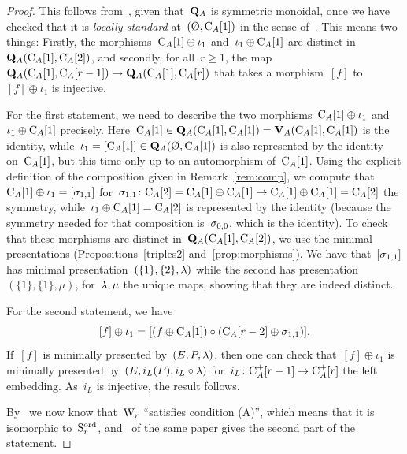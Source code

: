 \begin{proof}
This follows from~\cite[Prop.~2.9, Thm.~2.10]{Randal-Williams+Wahl}, given that~$\mathbf{Q}_A$ is symmetric monoidal, once we have checked that it is {\em locally standard} at~$(\emptyset,\rmC_A[1])$ in the sense of~\cite[Def.~2.5]{Randal-Williams+Wahl}. This means two things: Firstly, the morphisms~$\mathrm{C}_A[1]\oplus\iota_{1}$ and~$\iota_{1}\oplus\mathrm{C}_A[1]$ are distinct in~$\mathbf{Q}_A(\mathrm{C}_A[1],\mathrm{C}_A[2])$, and secondly, for all~$r\geqslant1$, the map~$\mathbf{Q}_A(\mathrm{C}_A[1],\mathrm{C}_A[r-1])\to \mathbf{Q}_A(\mathrm{C}_A[1],\mathrm{C}_A[r])$ that takes a morphism~$[f]$ to~$[f]\oplus\iota_{1}$ is injective.

For the first statement, 
we need to describe the two morphisms~$\mathrm{C}_A[1]\oplus\iota_{1}$ and~$\iota_{1}\oplus\mathrm{C}_A[1]$ precisely. Here~\hbox{$\mathrm{C}_A[1]\in \mathbf{Q}_A(\mathrm{C}_A[1],\mathrm{C}_A[1])=\mathbf{V}_A(\mathrm{C}_A[1],\mathrm{C}_A[1])$} is the identity, while~$\iota_1=[\rmC_A[1]]\in\bfQ_A(\emptyset,\rmC_A[1])$ is also represented by the identity on~$\mathrm{C}_A[1]$, but this time only up to an automorphism of~$\mathrm{C}_A[1]$. 
Using the explicit definition of the composition given in Remark~\ref{rem:comp}, we compute that~$\mathrm{C}_A[1]\oplus\iota_{1}=[\sigma_{1,1}]$ for~\hbox{$\sigma_{1,1}\colon\mathrm{C}_A[2]=\mathrm{C}_A[1]\oplus \mathrm{C}_A[1]\to \mathrm{C}_A[1]\oplus\mathrm{C}_A[1]=\mathrm{C}_A[2]$} the symmetry, while~$\iota_{1}\oplus\mathrm{C}_A[1]=\mathrm{C}_A[2]$ 
is represented by the identity (because the symmetry needed for that composition is~$\sigma_{0,0}$, which is the identity). 
To check that these morphisms are distinct in~$\mathbf{Q}_A(\mathrm{C}_A[1],\mathrm{C}_A[2])$, we use the minimal presentations (Propositions~\ref{triples2} and~\ref{prop:morphisms}). 
We have that~$[\sigma_{1,1}]$ has minimal presentation~$(\{1\},\{2\},\lambda)$ 
while the second has presentation~$(\{1\},\{1\},\mu)$, for~$\lambda,\mu$ the unique maps, showing that they are indeed distinct. 


For the second statement, we have
\[
[f]\oplus\iota_{1}=[(f\oplus\mathrm{C}_A[1])\circ (\mathrm{C}_A[r-2]\oplus\sigma_{1,1})].
\]
If~$[f]$ is minimally presented by~$(E,P,\lambda)$, then one can check that~$[f]\oplus\iota_{1}$ is minimally 
presented by~$(E,i_L(P),i_L\circ \lambda)$ for~$i_L\colon\mathrm{C}^+_A[r-1]\to \mathrm{C}^+_A[r]$ the left embedding. As~$i_L$ is injective, the result follows. 


By~\cite[Prop.~2.9]{Randal-Williams+Wahl} we now know that~$\mathrm{W}_r$ ``satisfies condition (A)'', which means that it is isomorphic to~$\mathrm{S}_r^{\operatorname{ord}}$, and~\cite[Thm.~2.10]{Randal-Williams+Wahl} of the same paper gives the second part of the statement.  
\end{proof}




